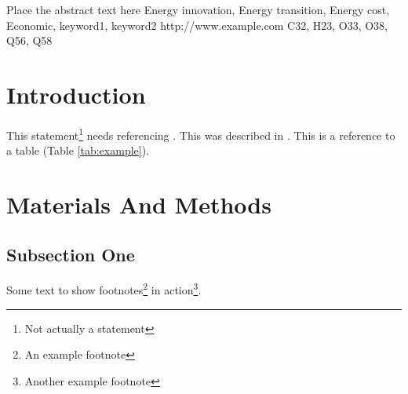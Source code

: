\documentclass[EJ]{IAEE}
\begin{document}
\maketitle %

\printaffiliations %


\abstractblock
{Place the abstract text here}
{Energy innovation, Energy transition, Energy cost, Economic, keyword1, keyword2} %
{http://www.example.com} %
{C32, H23, O33, O38, Q56, Q58} %


\section{Introduction}


This statement\footnote{Not actually a statement} needs referencing \citep{Figueredo:2009dg}. This was described in \cite{Figueredo:2009dg}. This is a reference to a table (Table \ref{tab:example}).


\section{Materials And Methods}

\subsection{Subsection One}

Some text to show footnotes\footnote{An example footnote} in action\footnote{Another example footnote}.
\end{document}
